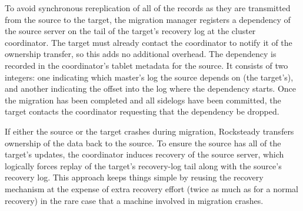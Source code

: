 To avoid synchronous rereplication of all of the records as they are
transmitted from the source to the target, the migration manager
registers a dependency of the source server on the tail of the target's
recovery log at the cluster coordinator. The target must already contact the
coordinator to notify it of the ownership transfer, so this adds no additional
overhead.  The dependency is recorded in the coordinator's tablet metadata for
the source. It consists of two integers: one indicating which
master's log the source depends on (the target's), and another indicating the offset
into the log where the dependency starts. Once the migration has been completed
and all sidelogs have been committed, the target contacts the
coordinator requesting that the dependency be dropped.

If either the source or the target crashes during migration, Rocksteady
transfers ownership of the data back to the source.  To ensure the source has
all of the target's updates, the coordinator induces recovery of the source
server, which logically forces replay of the target's recovery-log tail along
with the source's recovery log. This approach keeps things simple by reusing
the recovery mechanism at the expense of extra recovery effort (twice as much
as for a normal recovery) in the rare case that a machine involved in
migration crashes.
